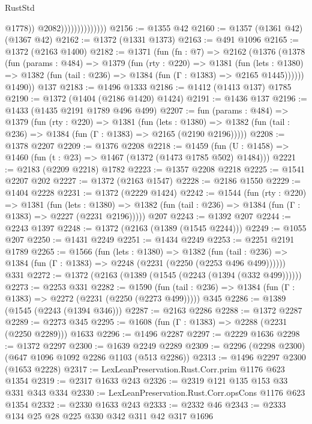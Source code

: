 \begin{lexlean}{RustStd}
\begin{coremodule}
                                    @1778))
                                @2082))))))))))))))
@2156 := @1355 @42
@2160 := @1357 (@1361 @42) (@1367 @42)
@2162 := @1372 (@1331 @1373)
@2163 := @491 @1096
@2165 := @1372 (@2163 @1400)
@2182 := @1371
    (fun (fn : @7) =>
    @2162
      (@1376
        (@1378
          (fun (params : @484) =>
          @1379
            (fun (rty : @220) =>
            @1381
              (fun (lets : @1380) =>
              @1382 (fun (tail : @236) => @1384 (fun (Γ : @1383) => @2165 @1445))))))
        @1490))
    @137
@2183 := @1496 @1333
@2186 := @1412 (@1413 @137) @1785
@2190 := @1372 (@1404 (@2186 @1420) @1424)
@2191 := @1436 @137
@2196 := @1433 (@1435 @2191 @1789 @496 @499)
@2207 := fun (params : @484) =>
  @1379
    (fun (rty : @220) =>
    @1381
      (fun (lets : @1380) =>
      @1382 (fun (tail : @236) => @1384 (fun (Γ : @1383) => @2165 (@2190 @2196)))))
@2208 := @1378 @2207
@2209 := @1376 @2208
@2218 := @1459 (fun (U : @1458) => @1460 (fun (t : @23) => @1467 (@1372 (@1473 @1785 @502) @1484)))
@2221 := @2183 (@2209 @2218) @1782
@2223 := @1357 @2208 @2218
@2225 := @1541 @2207 @202
@2227 := @1372 (@2163 @1547)
@2228 := @2186 @1550
@2229 := @1404 @2228
@2231 := @1372 (@2229 @1424)
@2242 := @1544
    (fun (rty : @220) =>
    @1381
      (fun (lets : @1380) =>
      @1382 (fun (tail : @236) => @1384 (fun (Γ : @1383) => @2227 (@2231 @2196)))))
    @207
@2243 := @1392 @207
@2244 := @2243 @1397
@2248 := @1372 (@2163 (@1389 (@1545 @2244)))
@2249 := @1055 @207
@2250 := @1431 @2249
@2251 := @1434 @2249
@2253 := @2251 @2191 @1789
@2265 := @1566
    (fun (lets : @1380) =>
    @1382 (fun (tail : @236) => @1384 (fun (Γ : @1383) => @2248 (@2231 (@2250 (@2253 @496 @499))))))
    @331
@2272 := @1372 (@2163 (@1389 (@1545 (@2243 (@1394 (@332 @499))))))
@2273 := @2253 @331
@2282 := @1590
    (fun (tail : @236) => @1384 (fun (Γ : @1383) => @2272 (@2231 (@2250 (@2273 @499)))))
    @345
@2286 := @1389 (@1545 (@2243 (@1394 @346)))
@2287 := @2163 @2286
@2288 := @1372 @2287
@2289 := @2273 @345
@2295 := @1608 (fun (Γ : @1383) => @2288 (@2231 (@2250 @2289))) @1633
@2296 := @1496 @2287
@2297 := @2229 @1636
@2298 := @1372 @2297
@2300 := @1639 @2249 @2289
@2309 := @2296 (@2298 @2300) (@647 @1096 @1092 @2286 @1103 (@513 @2286))
@2313 := @1496 @2297 @2300 (@1653 @2228)
@2317 := LexLeanPreservation.Rust.Corr.prim @1176 @623 @1354
@2319 := @2317 @1633 @243
@2326 := @2319 @121 @135 @153 @33 @331 @343 @334
@2330 := LexLeanPreservation.Rust.Corr.opsCons @1176 @623 @1354
@2332 := @2330 @1633 @243
@2333 := @2332 @46
@2343 := @2333 @134 @25 @28 @225 @330 @342 @311 @42 @317 @1696

\end{coremodule}
\end{lexlean}
